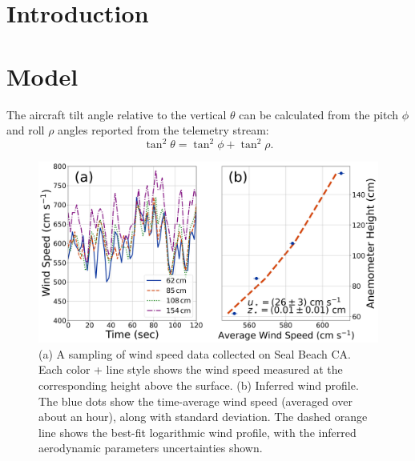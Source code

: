 \documentclass[linenumbers]{aastex631}
\begin{document}
\section{Introduction} \label{sec:Introduction}


\section{Model}

The aircraft tilt angle relative to the vertical $\theta$ can be calculated from the pitch $\phi$ and roll $\rho$ angles reported from the telemetry stream:
\begin{equation}
    \tan^2\theta = \tan^2 \phi + \tan^2 \rho.\label{eqn:tilt}
\end{equation}



\begin{figure}
    \centering
    \includegraphics[width=\textwidth]{figures and data/Seal_Beach_Windspeeds.jpg}
    \caption{(a) A sampling of wind speed data collected on Seal Beach CA. Each color + line style shows the wind speed measured at the corresponding height above the surface. (b) Inferred wind profile. The blue dots show the time-average wind speed (averaged over about an hour), along with standard deviation. The dashed orange line shows the best-fit logarithmic wind profile, with the inferred aerodynamic parameters uncertainties shown.}
    \label{fig:Seal_Beach_Windspeeds}
\end{figure}
\end{document}
